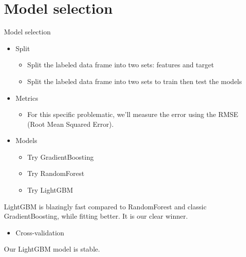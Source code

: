 \documentclass[
 size=14pt,
 paper=smartboard,  %
 mode=present, 		%
 display=slides, 	%
 style=tuliplab,  	%
 pauseslide,
 fleqn,leqno]{powerdot}
\begin{document}
\section{Model selection}


\begin{slide}{Model selection}
\begin{itemize}
\item
Split
\begin{itemize}
\item
Split the labeled data frame into two sets: features and target
\item
Split the labeled data frame into two sets to train then test the models
\end{itemize}
\item 
Metrics
\begin{itemize}
\item
For this specific problematic, we'll measure the error using the RMSE (Root Mean Squared Error).
\end{itemize}
\item
Models
\begin{itemize}
\item
Try GradientBoosting
\item
Try RandomForest
\item 
Try LightGBM
\end{itemize}
\end{itemize}
LightGBM is blazingly fast compared to RandomForest and classic GradientBoosting, while fitting better. It is our clear winner.
\begin{itemize}
\item
Cross-validation
\end{itemize}
Our LightGBM model is stable.

%
%
%
%

\end{slide}
\end{document}
